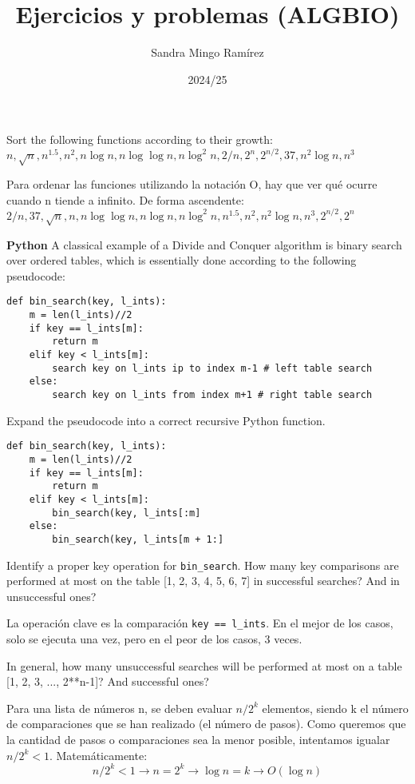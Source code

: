\documentclass[nochap]{config/ejercicios}
\title{Ejercicios y problemas (ALGBIO)}
\author{Sandra Mingo Ramírez}
\date{2024/25}
\begin{document}
\maketitle

\begin{problemS}
Sort the following functions according to their growth: \\
$n, \sqrt{n}, n^{1.5}, n^2, n \log n, n \log \log n, n \log^2 n, 2/n, 2^n, 2^{n/2}, 37, n^2 \log n, n^3$

Para ordenar las funciones utilizando la notación O, hay que ver qué ocurre cuando n tiende a infinito. De forma ascendente: \\
$2/n, 37,\sqrt{n}, n, n \log \log n, n \log n, n \log^2 n, n^{1.5}, n^2, n^2 \log n, n^3, 2^{n/2}, 2^n$
\end{problemS}

\begin{problemS} \textbf{Python}
A classical example of a Divide and Conquer algorithm is binary search over ordered tables, which is essentially done according to the following pseudocode:
\begin{lstlisting}
def bin_search(key, l_ints):
	m = len(l_ints)//2
	if key == l_ints[m]:
		return m
	elif key < l_ints[m]:
		search key on l_ints ip to index m-1 # left table search
	else:
		search key on l_ints from index m+1 # right table search
\end{lstlisting}

Expand the pseudocode into a correct recursive Python function.
\begin{lstlisting}
def bin_search(key, l_ints):
	m = len(l_ints)//2
	if key == l_ints[m]:
		return m
	elif key < l_ints[m]:
		bin_search(key, l_ints[:m]
	else:
		bin_search(key, l_ints[m + 1:]
\end{lstlisting}
\end{problemS}

\begin{problemS}
Identify a proper key operation for \texttt{bin\_search}. How many key comparisons are performed at most on the table [1, 2, 3, 4, 5, 6, 7] in successful searches? And in unsuccessful ones?

La operación clave es la comparación \texttt{key == l\_ints}. En el mejor de los casos, solo se ejecuta una vez, pero en el peor de los casos, 3 veces.
\end{problemS}

\begin{problemS}
In general, how many unsuccessful searches will be performed at most on a table [1, 2, 3, ..., 2**n-1]? And successful ones?

Para una lista de números n, se deben evaluar $n/2^k$ elementos, siendo k el número de comparaciones que se han realizado (el número de pasos). Como queremos que la cantidad de pasos o comparaciones sea la menor posible, intentamos igualar $n/2^k < 1$. Matemáticamente:
$$ n/2^k < 1 \rightarrow n = 2^k \rightarrow \log n = k \rightarrow O(\log n)$$
\end{problemS}
\end{document}
